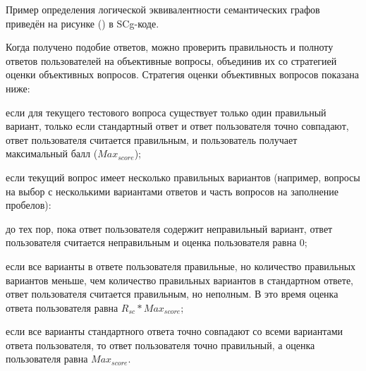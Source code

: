 Пример определения логической эквивалентности семантических графов приведён на рисунке (\textit{}) в SCg-коде. 

Когда получено подобие ответов, можно проверить правильность и полноту ответов пользователей на объективные вопросы, объединив их со стратегией оценки объективных вопросов. Стратегия оценки объективных вопросов показана ниже:

\begin{textitemize}
	\item если для текущего тестового вопроса существует только один правильный вариант, только если стандартный ответ и ответ пользователя точно совпадают, ответ пользователя считается правильным, и пользователь получает максимальный балл ($Max_{score}$);
	
	\item если текущий вопрос имеет несколько правильных вариантов (например, вопросы на выбор с несколькими вариантами ответов и часть вопросов на заполнение пробелов):
	
	\begin{textitemize}
		\item до тех пор, пока ответ пользователя содержит неправильный вариант, ответ пользователя считается неправильным и оценка пользователя равна 0;
		
		\item если все варианты в ответе пользователя правильные, но количество правильных вариантов меньше, чем количество правильных вариантов в стандартном ответе, ответ пользователя считается правильным, но неполным. В это время оценка ответа пользователя равна $R_{sc}*Max_{score}$;
		
		\item если все варианты стандартного ответа точно совпадают со всеми вариантами ответа пользователя, то ответ пользователя точно правильный, а оценка пользователя равна $Max_{score}$. 	
		
	\end{textitemize}
	
\end{textitemize}

